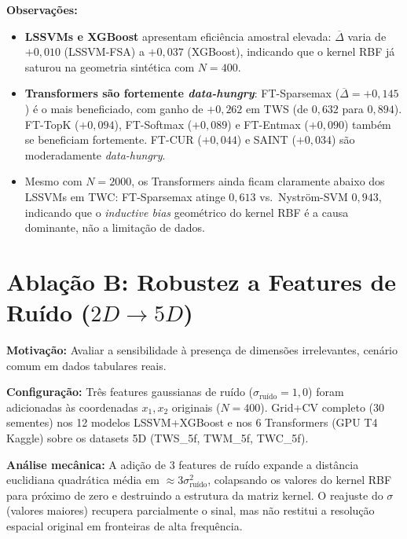 \documentclass[12pt,a4paper]{article}
\begin{document}
\textbf{Observações:}
\begin{itemize}
  \item \textbf{LSSVMs e XGBoost} apresentam eficiência amostral elevada:
        $\overline{\Delta}$ varia de $+0{,}010$ (LSSVM-FSA) a $+0{,}037$
        (XGBoost), indicando que o kernel RBF já saturou na geometria sintética
        com $N=400$.
  \item \textbf{Transformers são fortemente \textit{data-hungry}}: FT-Sparsemax
        ($\overline{\Delta}=+0{,}145$) é o mais beneficiado, com ganho de
        $+0{,}262$ em TWS (de $0{,}632$ para $0{,}894$). FT-TopK
        ($+0{,}094$), FT-Softmax ($+0{,}089$) e FT-Entmax ($+0{,}090$) também
        se beneficiam fortemente. FT-CUR ($+0{,}044$) e SAINT ($+0{,}034$)
        são moderadamente \textit{data-hungry}.
  \item Mesmo com $N=2000$, os Transformers ainda ficam claramente abaixo dos
        LSSVMs em TWC: FT-Sparsemax atinge $0{,}613$ vs.\ Nyström-SVM $0{,}943$,
        indicando que o \emph{inductive bias} geométrico do kernel RBF é a causa
        dominante, não a limitação de dados.
\end{itemize}

\section{Ablação B: Robustez a Features de Ruído ($2D \to 5D$)}
\label{sec:noise}

\textbf{Motivação:} Avaliar a sensibilidade à presença de dimensões irrelevantes,
cenário comum em dados tabulares reais.

\textbf{Configuração:} Três features gaussianas de ruído ($\sigma_\text{ruído}=1{,}0$)
foram adicionadas às coordenadas $x_1, x_2$ originais ($N=400$).
Grid+CV completo (30 sementes) nos 12 modelos LSSVM+XGBoost e nos 6
Transformers (GPU T4 Kaggle) sobre os datasets 5D (TWS\_5f, TWM\_5f, TWC\_5f).



\textbf{Análise mecânica:} A adição de 3 features de ruído expande a distância
euclidiana quadrática média em $\approx 3\sigma_\text{ruído}^2$, colapsando os
valores do kernel RBF para próximo de zero e destruindo a estrutura da matriz
kernel. O reajuste do $\sigma$ (valores maiores) recupera parcialmente o sinal,
mas não restitui a resolução espacial original em fronteiras de alta frequência.
\end{document}
